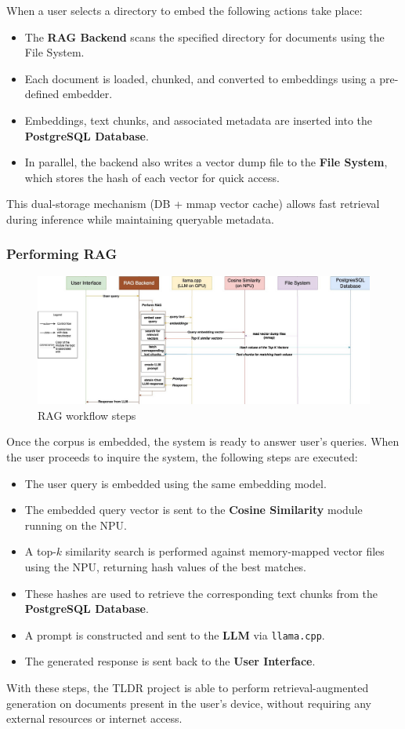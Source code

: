 When a user selects a directory to embed the following actions take place:
\begin{itemize}
    \item The \textbf{RAG Backend} scans the specified directory for documents using the File System.
    \item Each document is loaded, chunked, and converted to embeddings using a pre-defined embedder.
    \item Embeddings, text chunks, and associated metadata are inserted into the \textbf{PostgreSQL Database}.
    \item In parallel, the backend also writes a vector dump file to the \textbf{File System}, which stores the hash of each vector for quick access.
\end{itemize}
This dual-storage mechanism (DB + mmap vector cache) allows fast retrieval during inference while maintaining queryable metadata.

\subsubsection{Performing RAG}
\label{subsec:AppDesignWorkflow-PerformingRAG}
\begin{figure}[H]
    \centering
    \includegraphics[width=1.0\linewidth]{images/tldr-app-worklfow-pt3.jpg}
    \caption{RAG workflow steps}
    \label{fig:ragworkflowsteps}
\end{figure}

Once the corpus is embedded, the system is ready to answer user's queries. When the user proceeds to inquire the system, the following steps are executed:

\begin{itemize}
    \item The user query is embedded using the same embedding model.
    \item The embedded query vector is sent to the \textbf{Cosine Similarity} module running on the NPU.
    \item A top-$k$ similarity search is performed against memory-mapped vector files using the NPU, returning hash values of the best matches.
    \item These hashes are used to retrieve the corresponding text chunks from the \textbf{PostgreSQL Database}.
    \item A prompt is constructed and sent to the \textbf{LLM} via \texttt{llama.cpp}.
    \item The generated response is sent back to the \textbf{User Interface}.
\end{itemize}


With these steps, the TLDR project is able to perform retrieval-augmented generation on documents present in the user's device, without requiring any external resources or internet access.
